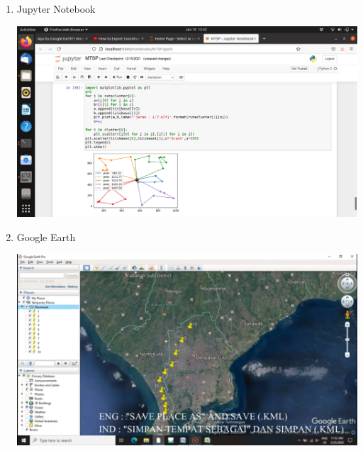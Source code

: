 \begin{enumerate}

\item Jupyter Notebook

\includegraphics[width=13cm]{instrumen2.png}

\item Google Earth

\includegraphics[width=13cm]{instrumen1.png}

\end{enumerate}
